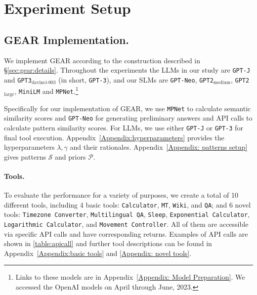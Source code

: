 \documentclass[11pt]{article}
\newcommand{\daniel}[1]{{\color{purple}[DK: #1]}}
\newcommand{\danielchange}[2]{{\color{red}{\st{#1}}{#2}}}
\newcommand{\llm}{\textcolor{darkredTwo}{LLM}}
\newcommand{\slm}{\textcolor{darkblueTwo}{SLM}}
\newcommand{\name}{{\fontfamily{cmss}\selectfont GEAR}}
\newcommand{\calc}{{\tt Calculator}}
\newcommand{\mt}{{\tt MT}}
\newcommand{\qa}{{\tt QA}}
\newcommand{\wiki}{{\tt Wiki}}
\newcommand{\mlqa}{{\tt Multilingual QA}}
\newcommand{\tz}{{\tt Timezone Converter}}
\newcommand{\expcalc}{{\tt Exponential Calculator}}
\newcommand{\logcalc}{{\tt Logarithmic Calculator}}
\newcommand{\sleep}{{\tt Sleep}}
\newcommand{\map}{{\tt Movement Controller}}
\newcommand{\gptj}{{\tt \textcolor{darkredTwo}{GPT-J}}}
\newcommand{\gptDavinciThree}{{\tt \textcolor{darkredTwo}{GPT3$_{\text{davinci-003}}$}}}
\newcommand{\gptNeo}{{\tt \textcolor{darkblueTwo}{GPT-Neo}}}
\newcommand{\gptTwoLarge}{{\tt \textcolor{darkblueTwo}{GPT2$_{\text{large}}$}}}
\newcommand{\gptTwo}{{\tt \textcolor{darkblueTwo}{GPT2$_{\text{medium}}$}}}
\newcommand{\miniLM}{{\tt \textcolor{darkblueTwo}{MiniLM}}}
\newcommand{\gptThree}{{\tt \textcolor{darkredTwo}{GPT-3}}}
\newcommand{\mpnet}{{\tt \textcolor{darkblueTwo}{MPNet}}}
\begin{document}
\section{Experiment Setup}
\label{section:experiment:setup}

\subsection{\name{} Implementation.}

We implement \name{} according to the construction described in \S\ref{sec:gear:details}. 
Throughout the experiments the \llm s  in our study are \gptj{} and \gptDavinciThree{} (in short, \gptThree{}), and our \slm s are \gptNeo{}, \gptTwo{}, \gptTwoLarge{}, \miniLM{} and \mpnet.\footnote{
Links to these models are in Appendix~\ref{Appendix: Model Preparation}.
We accessed the OpenAI models on April through June, 2023.}

Specifically for our implementation of \name, we use \mpnet{} to calculate semantic similarity scores and \gptNeo{} for generating preliminary answers and API calls to calculate pattern similarity scores. For \llm s, we use either \gptj{} or \gptThree{} for final tool execution. 
Appendix~\ref{Appendix:hyperparameters} provides the hyperparameters $\lambda, \gamma$ and their rationales. Appendix~\ref{Appendix: patterns setup} gives patterns $\mathcal{S}$ and priors $\mathcal{P}$.

\paragraph{Tools.} To evaluate the performance for a variety of purposes, we create a total of 10 different tools, including 4 basic tools: \calc{}, \mt{}, \wiki{}, and \qa{}; and 6 novel tools: \tz{}, \mlqa{}, \sleep{}, \expcalc{}, \logcalc{}, and \map{}. All of them are accessible via specific API calls and have corresponding returns. Examples of API calls are shown in \autoref{table:apicall} and further tool descriptions can be found in Appendix~\ref{Appendix:basic tools} and \ref{Appendix: novel tools}. 

\end{document}
